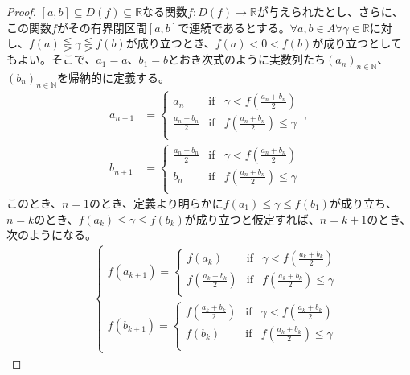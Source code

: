 \documentclass[dvipdfmx]{jsarticle}
\begin{document}
\begin{proof}
$[ a,b] \subseteq D(f) \subseteq \mathbb{R}$なる関数$f:D(f) \rightarrow \mathbb{R}$が与えられたとし、さらに、この関数$f$がその有界閉区間$[ a,b]$で連続であるとする。$\forall a,b \in A\forall\gamma \in \mathbb{R}$に対し、$f(a) \lesseqgtr \gamma \lesseqgtr f(b)$が成り立つとき、$f(a) < 0 < f(b)$が成り立つとしてもよい。そこで、$a_{1} = a$、$b_{1} = b$とおき次式のように実数列たち$\left( a_{n} \right)_{n \in \mathbb{N}}$、$\left( b_{n} \right)_{n \in \mathbb{N}}$を帰納的に定義する。
\begin{align*}
a_{n + 1} &= \left\{ \begin{matrix}
a_{n} & \mathrm{if} & \gamma < f\left( \frac{a_{n} + b_{n}}{2} \right) \\
\frac{a_{n} + b_{n}}{2} & \mathrm{if} & f\left( \frac{a_{n} + b_{n}}{2} \right) \leq \gamma \\
\end{matrix} \right.\ ,\\
b_{n + 1} &= \left\{ \begin{matrix}
\frac{a_{n} + b_{n}}{2} & \mathrm{if} & \gamma < f\left( \frac{a_{n} + b_{n}}{2} \right) \\
b_{n} & \mathrm{if} & f\left( \frac{a_{n} + b_{n}}{2} \right) \leq \gamma \\
\end{matrix} \right.\ 
\end{align*}
このとき、$n = 1$のとき、定義より明らかに$f\left( a_{1} \right) \leq \gamma \leq f\left( b_{1} \right)$が成り立ち、$n = k$のとき、$f\left( a_{k} \right) \leq \gamma \leq f\left( b_{k} \right)$が成り立つと仮定すれば、$n = k + 1$のとき、次のようになる。
\begin{align*}
&\quad \left\{ \begin{matrix}
f\left( a_{k + 1} \right) = \left\{ \begin{matrix}
f\left( a_{k} \right) & \mathrm{if} & \gamma < f\left( \frac{a_{k} + b_{k}}{2} \right) \\
f\left( \frac{a_{k} + b_{k}}{2} \right) & \mathrm{if} & f\left( \frac{a_{k} + b_{k}}{2} \right) \leq \gamma \\
\end{matrix} \right.\  \\
f\left( b_{k + 1} \right) = \left\{ \begin{matrix}
f\left( \frac{a_{k} + b_{k}}{2} \right) & \mathrm{if} & \gamma < f\left( \frac{a_{k} + b_{k}}{2} \right) \\
f\left( b_{k} \right) & \mathrm{if} & f\left( \frac{a_{k} + b_{k}}{2} \right) \leq \gamma \\

\end{matrix}
\end{matrix}
\end{align*}
\end{proof}
\end{document}
